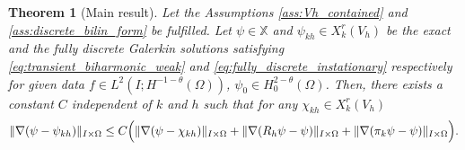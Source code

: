 \documentclass{m2an}
\newcommand{\1}{\mathds{1}}
\newcommand{\Om}{\Omega}
\DeclarePairedDelimiter{\norm}{\lVert}{\rVert}
\newcommand{\na}{\nabla}
\newcommand{\XX}{\mathbb{X}}
\newtheorem{theorem}{Theorem}[section]
\theoremstyle{definition}
\begin{document}
\begin{theorem}[Main result]\label{thm:error fully discrete}
  Let the Assumptions \ref{ass:Vh_contained} and \ref{ass:discrete_bilin_form} be fulfilled.
  Let $\psi \in \XX$ and $\psi_{kh} \in X_k^r(V_h)$ be the exact and the fully discrete Galerkin solutions satisfying \eqref{eq:transient_biharmonic_weak} and \eqref{eq:fully_discrete_instationary} respectively 
  for given data $f \in L^2(I;H^{-1-\theta}(\Om))$, $\psi_0 \in H^{2-\theta}_0(\Om)$.
  Then, there exists a constant $C$ independent of $k$ and $h$ such that  for any $\chi_{kh}\in X^r_k(V_h)$
\begin{equation}\label{eq:error fully discrete}
    \norm{\na(\psi-\psi_{kh})}_{I\times\Omega} 
    \leq C  \Big(\norm{\na(\psi-\chi_{kh})}_{I\times\Omega}
    +\norm{\na (R_h \psi - \psi)}_{I\times\Omega} 
    +\norm{\na (\pi_k\psi - \psi)}_{I\times\Omega} \Big).
\end{equation}
\end{theorem}
\end{document}
